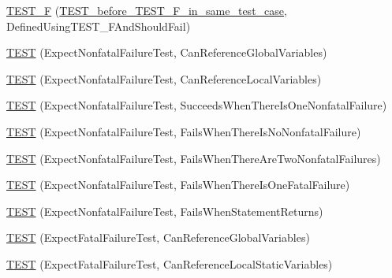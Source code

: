 \begin{DoxyCompactItemize}
\item 
\mbox{\hyperlink{googletest-master_2googletest_2test_2googletest-output-test___8cc_aa0ba9be79b1b05ddadfc8d25c099df31}{T\+E\+S\+T\+\_\+F}} (\mbox{\hyperlink{class_t_e_s_t__before___t_e_s_t___f__in__same__test__case}{T\+E\+S\+T\+\_\+before\+\_\+\+T\+E\+S\+T\+\_\+\+F\+\_\+in\+\_\+same\+\_\+test\+\_\+case}}, Defined\+Using\+T\+E\+S\+T\+\_\+\+F\+And\+Should\+Fail)
\item 
\mbox{\hyperlink{googletest-master_2googletest_2test_2googletest-output-test___8cc_a3dd01f9996bd85dd50bd7632f58cbf8c}{T\+E\+ST}} (Expect\+Nonfatal\+Failure\+Test, Can\+Reference\+Global\+Variables)
\item 
\mbox{\hyperlink{googletest-master_2googletest_2test_2googletest-output-test___8cc_afe7af77e310ee1a7599e2bc1f0f14354}{T\+E\+ST}} (Expect\+Nonfatal\+Failure\+Test, Can\+Reference\+Local\+Variables)
\item 
\mbox{\hyperlink{googletest-master_2googletest_2test_2googletest-output-test___8cc_ac144593aa4a95ae47c0bb03def354f66}{T\+E\+ST}} (Expect\+Nonfatal\+Failure\+Test, Succeeds\+When\+There\+Is\+One\+Nonfatal\+Failure)
\item 
\mbox{\hyperlink{googletest-master_2googletest_2test_2googletest-output-test___8cc_a3984cefae98995e99cc3de7251998c34}{T\+E\+ST}} (Expect\+Nonfatal\+Failure\+Test, Fails\+When\+There\+Is\+No\+Nonfatal\+Failure)
\item 
\mbox{\hyperlink{googletest-master_2googletest_2test_2googletest-output-test___8cc_a17f835822727dac7b75b74ed70d2fbd2}{T\+E\+ST}} (Expect\+Nonfatal\+Failure\+Test, Fails\+When\+There\+Are\+Two\+Nonfatal\+Failures)
\item 
\mbox{\hyperlink{googletest-master_2googletest_2test_2googletest-output-test___8cc_ab9c67cf52ef031fdf619d61283da1ca7}{T\+E\+ST}} (Expect\+Nonfatal\+Failure\+Test, Fails\+When\+There\+Is\+One\+Fatal\+Failure)
\item 
\mbox{\hyperlink{googletest-master_2googletest_2test_2googletest-output-test___8cc_aa5976cbca1620f7fea18689a3cbf5333}{T\+E\+ST}} (Expect\+Nonfatal\+Failure\+Test, Fails\+When\+Statement\+Returns)
\item 
\mbox{\hyperlink{googletest-master_2googletest_2test_2googletest-output-test___8cc_a4b06191d54fb76270da3d3dd497e62b6}{T\+E\+ST}} (Expect\+Fatal\+Failure\+Test, Can\+Reference\+Global\+Variables)
\item 
\mbox{\hyperlink{googletest-master_2googletest_2test_2googletest-output-test___8cc_ac6646aa5f6d4ea21c0528259118754a4}{T\+E\+ST}} (Expect\+Fatal\+Failure\+Test, Can\+Reference\+Local\+Static\+Variables)

\end{DoxyCompactItemize}
